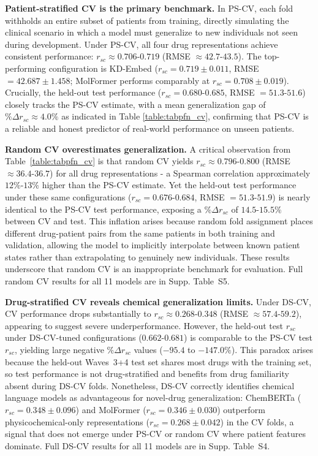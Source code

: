 \documentclass[pdflatex,sn-mathphys-num]{sn-jnl}
\theoremstyle{thmstyleone}
\theoremstyle{thmstyletwo}
\theoremstyle{thmstylethree}
\begin{document}
\textbf{Patient-stratified CV is the primary benchmark.} In PS-CV, each fold withholds an entire subset of patients from training, directly simulating the clinical scenario in which a model must generalize to new individuals not seen during development. Under PS-CV, all four drug representations achieve consistent performance: $r_{sc} \approx 0.706$-$0.719$ (RMSE $\approx 42.7$-$43.5$). The top-performing configuration is KD-Embed ($r_{sc} = 0.719 \pm 0.011$, RMSE $= 42.687 \pm 1.458$; MolFormer performs comparably at $r_{sc} = 0.708 \pm 0.019$). Crucially, the held-out test performance ($r_{sc} = 0.680$-$0.685$, RMSE $= 51.3$-$51.6$) closely tracks the PS-CV estimate, with a mean generalization gap of $\%\Delta r_{sc} \approx 4.0\%$ as indicated in Table \ref{table:tabpfn_cv}, confirming that PS-CV is a reliable and honest predictor of real-world performance on unseen patients.

\textbf{Random CV overestimates generalization.} A critical observation from Table~\ref{table:tabpfn_cv} is that random CV yields $r_{sc} \approx 0.796$-$0.800$ (RMSE $\approx 36.4$-$36.7$) for all drug representations - a Spearman correlation approximately $12\%$-$13\%$ higher than the PS-CV estimate. Yet the held-out test performance under these same configurations ($r_{sc} = 0.676$-$0.684$, RMSE $= 51.3$-$51.9$) is nearly identical to the PS-CV test performance, exposing a $\%\Delta r_{sc}$ of $14.5$-$15.5\%$ between CV and test. This inflation arises because random fold assignment places different drug-patient pairs from the same patients in both training and validation, allowing the model to implicitly interpolate between known patient states rather than extrapolating to genuinely new individuals. These results underscore that random CV is an inappropriate benchmark for evaluation. Full random CV results for all 11 models are in Supp. Table~S5.

\textbf{Drug-stratified CV reveals chemical generalization limits.} Under DS-CV, CV performance drops substantially to $r_{sc} \approx 0.268$-$0.348$ (RMSE $\approx 57.4$-$59.2$), appearing to suggest severe underperformance. However, the held-out test $r_{sc}$ under DS-CV-tuned configurations ($0.662$-$0.681$) is comparable to the PS-CV test $r_{sc}$, yielding large negative $\%\Delta r_{sc}$ values ($-95.4$ to $-147.0\%$). This paradox arises because the held-out Waves~3+4 test set shares most drugs with the training set, so test performance is not drug-stratified and benefits from drug familiarity absent during DS-CV folds. Nonetheless, DS-CV correctly identifies chemical language models as advantageous for novel-drug generalization: ChemBERTa ($r_{sc} = 0.348 \pm 0.096$) and MolFormer ($r_{sc} = 0.346 \pm 0.030$) outperform physicochemical-only representations ($r_{sc} = 0.268 \pm 0.042$) in the CV folds, a signal that does not emerge under PS-CV or random CV where patient features dominate. Full DS-CV results for all 11 models are in Supp. Table~S4.
\end{document}
